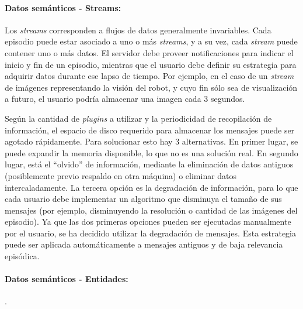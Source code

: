 \paragraph{Datos semánticos - Streams:}
Los \textit{streams} corresponden a flujos de datos generalmente invariables. Cada episodio puede estar asociado a uno o más \textit{streams}, y a su vez, cada \textit{stream} puede contener uno o más datos. El servidor debe proveer notificaciones para indicar el inicio y fin de un episodio, mientras que el usuario debe definir su estrategia para adquirir datos durante ese lapso de tiempo. Por ejemplo, en el caso de un \textit{stream} de imágenes representando la visión del robot, y cuyo fin sólo sea de visualización a futuro, el usuario podría almacenar una imagen cada 3 segundos. 

Según la cantidad de \textit{plugins} a utilizar y la periodicidad de recopilación de información, el espacio de disco requerido para almacenar los mensajes puede ser agotado rápidamente. Para solucionar esto hay 3 alternativas. En primer lugar, se puede expandir la memoria disponible, lo que no es una solución real. En segundo lugar, está el ``olvido'' de información, mediante la eliminación de datos antiguos (posiblemente previo respaldo en otra máquina) o eliminar datos intercaladamente. La tercera opción es la degradación de información, para lo que cada usuario debe implementar un algoritmo que disminuya el tamaño de sus mensajes (por ejemplo, disminuyendo la resolución o cantidad de las imágenes del episodio). Ya que las dos primeras opciones pueden ser ejecutadas manualmente por el usuario, se ha decidido utilizar la degradación de mensajes. Esta estrategia puede ser aplicada automáticamente a mensajes antiguos y de baja relevancia episódica.



\paragraph{Datos semánticos - Entidades:}
.


